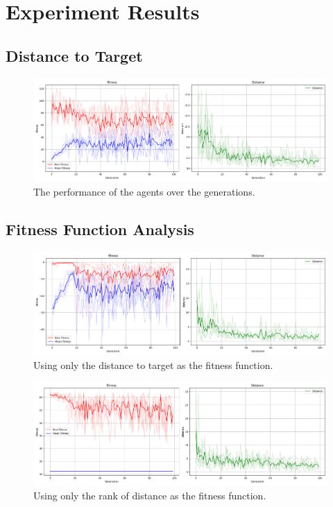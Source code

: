 \documentclass[sigconf]{acmart}
\begin{document}
\section{Experiment Results}
\subsection{Distance to Target}
\begin{figure}[t]
  \centering
  \includegraphics[width=0.95\linewidth]{imgs/result_Run_cx0.85_mut0.25_2024_1214_0619.png}
  \caption{The performance of the agents over the generations.}
  \label{fig:plot_all}
\end{figure}

\subsection{Fitness Function Analysis}
\begin{figure}[t]
  \centering
  \includegraphics[width=0.95\linewidth]{imgs/result_Run_cx0.85_mut0.25_2024_1214_0633_dist_only.png}
  \caption{Using only the distance to target as the fitness function.}
  \label{fig:plot_dist}
\end{figure}

\begin{figure}[t]
  \centering
  \includegraphics[width=0.95\linewidth]{imgs/result_Run_cx0.85_mut0.25_2024_1214_0634_rank_only.png}
  \caption{Using only the rank of distance as the fitness function.}
  \label{fig:plot_rank}
\end{figure}
\end{document}

